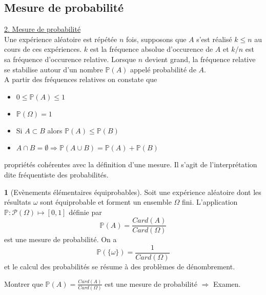 \documentclass[8pt,notheorems]{beamer}
\theoremstyle{definition}
\theoremstyle{example}
\newtheorem{example}{\translate{Exemple}}
\theoremstyle{mystyle}
\theoremstyle{plain}
\begin{document}
\subsection{Mesure de probabilité}
\begin{frame}[allowframebreaks]
\underline{2. Mesure de probabilité}\\
Une expérience aléatoire est répétée $n$ fois, supposons que $A$ s'est réalisé $k\leq n$ au cours de ces expériences. $k$ est la fréquence absolue d'occurence de $A$ et $k/n$ est sa fréquence d'occurence relative. Lorsque $n$ devient grand, la fréquence relative se stabilise autour d'un nombre $\mathbb{P}(A)$ appelé probabilité de $A$.\\

A partir des fréquences relatives on constate que 
\begin{itemize}
    \item $0\leq \mathbb{P}(A)\leq 1$
    \item $\mathbb{P}(\Omega)= 1$
    \item Si $A\subset B$ alors  $\mathbb{P}(A)\leq \mathbb{P}(B)$
    \item $A\cap B = \emptyset\Rightarrow \mathbb{P}(A\cup B) = \mathbb{P}(A) + \mathbb{P}(B)$
\end{itemize}
propriétés cohérentes avec la définition d'une mesure. Il s'agit de l'interprétation dite fréquentiste des probabilités. 
\begin{example}[Evènements élémentaires équiprobables]
Soit une expérience aléatoire dont les résultats $\omega$ sont équiprobable et forment un ensemble $\Omega$ fini. L'application $\mathbb{P}:\mathcal{P}(\Omega)\mapsto[0,1]$ définie par
$$
\mathbb{P}(A) = \frac{Card(A)}{Card(\Omega)}
$$ 
est une mesure de probabilité. On a 
$$
\mathbb{P}(\{\omega\}) = \frac{1}{Card(\Omega)}
$$ 
et le calcul des probabilités se résume à des problèmes de dénombrement. 
\end{example}
Montrer que $\mathbb{P}(A) = \frac{Card(A)}{Card(\Omega)}$ est une mesure de probabilité $\Rightarrow$ Examen. 
\end{frame}
\end{document}
